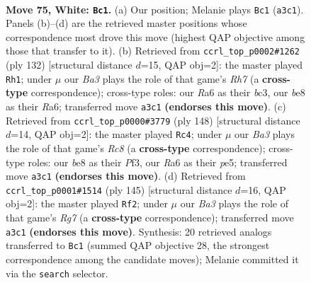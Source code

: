 \documentclass[11pt]{article}
\begin{document}
\clearpage

\begin{figure}[p]\centering
\begin{subfigure}{0.46\textwidth}\centering
\resizebox{\linewidth}{!}{%
\newchessgame
\chessboard[
  setfen={4b1k1/8/R7/8/1P6/B7/2p3r1/K7 w - - 2 75},
  showmover=false,
  pgfstyle=straightmove, color=movearrow, markmove={a3-c1}
]}
\caption{}
\end{subfigure}\hfill
\begin{subfigure}{0.46\textwidth}\centering
\resizebox{\linewidth}{!}{%
\newchessgame
\chessboard[
  setfen={1r3k2/7R/R7/8/8/1pb3K1/8/8 w - - 5 67},
  showmover=false,
  pgfstyle=straightmove, color=movearrow, markmove={h7-h1}
]}
\caption{}
\end{subfigure}
\\[4pt]
\begin{subfigure}{0.46\textwidth}\centering
\resizebox{\linewidth}{!}{%
\newchessgame
\chessboard[
  setfen={2R5/6k1/8/4p1r1/7p/5P2/5K2/8 w - - 0 75},
  showmover=false,
  pgfstyle=straightmove, color=movearrow, markmove={c8-c4}
]}
\caption{}
\end{subfigure}\hfill
\begin{subfigure}{0.46\textwidth}\centering
\resizebox{\linewidth}{!}{%
\newchessgame
\chessboard[
  setfen={3R4/8/8/6pP/4k3/8/6r1/3K4 b - - 13 73},
  showmover=false,
  pgfstyle=straightmove, color=movearrow, markmove={g2-f2}
]}
\caption{}
\end{subfigure}
\caption{\textbf{Move 75, White: \texttt{Bc1}.} (a) Our position; Melanie plays \texttt{Bc1} (\texttt{a3c1}). Panels (b)--(d) are the retrieved master positions whose correspondence most drove this move (highest QAP objective among those that transfer to it). (b) Retrieved from \texttt{ccrl\_top\_p0002\#1262} (ply 132) [structural distance $d$=15, QAP obj=2]: the master played \texttt{Rh1}; under $\mu$ our \emph{Ba3} plays the role of that game's \emph{Rh7} (a \textbf{cross-type} correspondence); cross-type roles: our \emph{R}a6 as their \emph{b}c3, our \emph{b}e8 as their \emph{R}a6; transferred move \texttt{a3c1} \textbf{(endorses this move)}. (c) Retrieved from \texttt{ccrl\_top\_p0000\#3779} (ply 148) [structural distance $d$=14, QAP obj=2]: the master played \texttt{Rc4}; under $\mu$ our \emph{Ba3} plays the role of that game's \emph{Rc8} (a \textbf{cross-type} correspondence); cross-type roles: our \emph{b}e8 as their \emph{P}f3, our \emph{R}a6 as their \emph{p}e5; transferred move \texttt{a3c1} \textbf{(endorses this move)}. (d) Retrieved from \texttt{ccrl\_top\_p0001\#1514} (ply 145) [structural distance $d$=16, QAP obj=2]: the master played \texttt{Rf2}; under $\mu$ our \emph{Ba3} plays the role of that game's \emph{Rg7} (a \textbf{cross-type} correspondence); transferred move \texttt{a3c1} \textbf{(endorses this move)}. Synthesis: 20 retrieved analogs transferred to \texttt{Bc1} (summed QAP objective 28, the strongest correspondence among the candidate moves); Melanie committed it via the \texttt{search} selector.}
\label{fig:thought-m148}
\end{figure}
\end{document}
